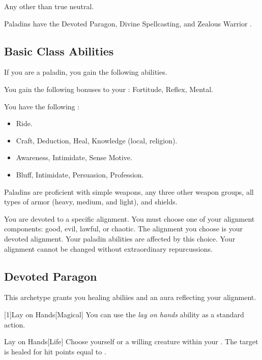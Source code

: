      Any other than true neutral.

     Paladins have the Devoted Paragon, Divine Spellcasting, and Zealous Warrior .

    \subsection{Basic Class Abilities}
        If you are a paladin, you gain the following abilities.

        You gain the following bonuses to your :  Fortitude,  Reflex,  Mental.

        You have the following :
        \begin{itemize}
            \item {} Ride.
            \item {} Craft, Deduction, Heal, Knowledge (local, religion).
            \item {} Awareness, Intimidate, Sense Motive.
            \item {} Bluff, Intimidate, Persuasion, Profession.
        \end{itemize}

        Paladins are proficient with simple weapons, any three other weapon groups, all types of armor (heavy, medium, and light), and shields.

        You are devoted to a specific alignment.
        You must choose one of your alignment components: good, evil, lawful, or chaotic.
        The alignment you choose is your devoted alignment.
        Your paladin abilities are affected by this choice.
        Your alignment cannot be changed without extraordinary repurcussions.

    \subsection{Devoted Paragon}
        This archetype grants you healing abiliies and an aura reflecting your alignment.

        [1]{Lay on Hands}[Magical] You can use the \textit{lay on hands} ability as a standard action.
        \begin{freeability}{Lay on Hands}[Life]
            Choose yourself or a willing creature within your .
            The target is healed for hit points equal to .
        \end{freeability}

